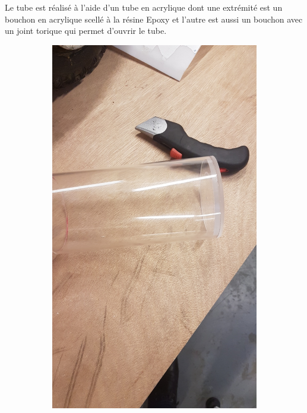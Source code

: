 \documentclass[a4paper,11pt]{report}
\begin{document}
					
					\newpage
				
		Le tube est réalisé à l'aide d'un tube en acrylique dont une extrémité est un bouchon en acrylique scellé à la résine Epoxy et l'autre est aussi un bouchon avec un joint torique qui permet d'ouvrir le tube.
		
					\begin{figure}[!h]
						\centering
							\begin{subfigure}[b]{0.3\textwidth}
								\includegraphics[width=\textwidth]{Photos/Capture9.jpeg}

\end{subfigure}
\end{figure}
\end{document}
